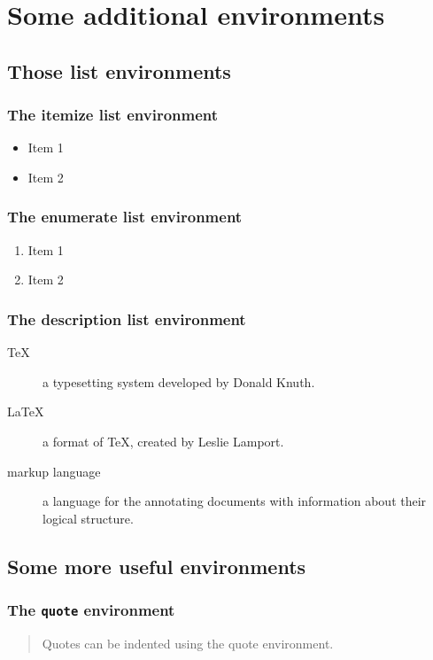 \documentclass[a4paper,oneside]{book}
\begin{document}
\section{Some additional environments}


\subsection{Those list environments}


\subsubsection{The \textbf{itemize} list environment}
\begin{itemize}
  \item Item 1
  \item Item 2
\end{itemize}


\subsubsection{The \textbf{enumerate} list environment}
\begin{enumerate}
  \item Item 1
  \item Item 2
\end{enumerate}


\subsubsection{The \textbf{description} list environment}
\begin{description}
  \item[\TeX] a typesetting system developed by Donald Knuth.
  \item[\LaTeX] a format of \TeX, created by Leslie Lamport.
  \item[markup language] a language for the annotating documents with information about their logical structure.
\end{description}


\subsection{Some more useful environments}


\subsubsection{The \texttt{quote} environment}
\begin{quote}
Quotes can be indented using the quote environment.
\end{quote}
\end{document}
